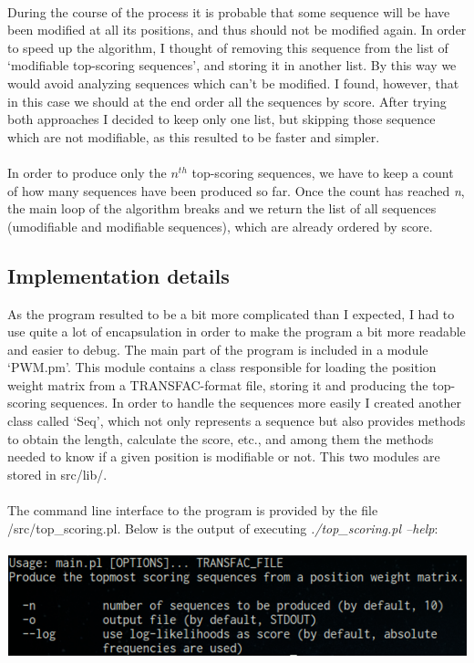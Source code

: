 \documentclass{article}
\begin{document}
\begin{enumerate}[a)]
\\
During the course of the process it is probable that some sequence will be have been modified at all its positions, and thus should not be modified again. In order to speed up the algorithm, I thought of removing this sequence from the list of `modifiable top-scoring sequences', and storing it in another list. By this way we would avoid analyzing sequences which can't be modified. I found, however, that in this case we should at the end order all the sequences by score. After trying both approaches I decided to keep only one list, but skipping those sequence which are not modifiable, as this resulted to be faster and simpler.\\
\\
In order to produce only the \(n^{th}\) top-scoring sequences, we have to keep a count of how many sequences have been produced so far. Once the count has reached \emph{n}, the main loop of the algorithm breaks and we return the list of all sequences (umodifiable and modifiable sequences), which are already ordered by score.
\end{enumerate}

\subsection{Implementation details} \label{implementation}

As the program resulted to be a bit more complicated than I expected, I had to use quite a lot of encapsulation in order to make the program a bit more readable and easier to debug. The main part of the program is included in a module `PWM.pm'. This module contains a class responsible for loading the position weight matrix from a TRANSFAC-format file, storing it and producing the top-scoring sequences. In order to handle the sequences more easily I created another class called `Seq', which not only represents a sequence but also provides methods to obtain the length, calculate the score, etc., and among them the methods needed to know if a given position is modifiable or not. This two modules are stored in src/lib/.\\\\
The command line interface to the program is provided by the file /src/top\_scoring.pl. Below is the output of executing \emph{./top\_scoring.pl --help}:\\\\
\includegraphics[scale=0.5]{perl}
\end{document}
